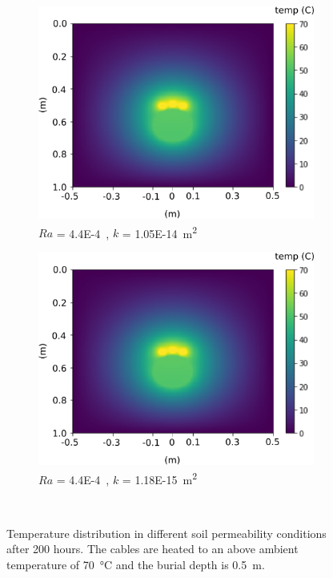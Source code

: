 \documentclass[Journal,letterpaper,InsideFigs]{ascelike-new}
\begin{document}
\begin{figure}[ht]
\begin{subfigure}[b]{0.49\textwidth}
    \includegraphics[width=\textwidth]{figs/ra/0p0049.png}
    \caption{$Ra$ = \SI{4.4E-4}, $k$ = \SI{1.05E-14}{\meter\squared}}
 \end{subfigure}
 \begin{subfigure}[b]{0.49\textwidth}
    \includegraphics[width=\textwidth]{figs/ra/0p00049.png}
    \caption{$Ra$ = \SI{4.4E-4}, $k$ = \SI{1.18E-15}{\meter\squared}}
 \end{subfigure}\\ 
 \caption{Temperature distribution in different soil permeability conditions after 200 hours. The cables are heated to an above ambient temperature of \SI{70}{\celsius} and the burial depth is \SI{0.5}{\meter}.}
 \label{fig:ra-evol}
\end{figure}
\end{document}

